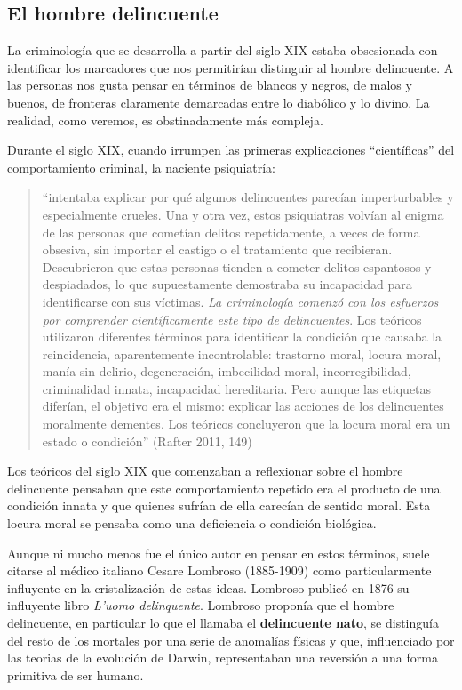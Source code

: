 \documentclass[
  spanish,
  letterpaper,
  DIV=11,
  numbers=noendperiod]{scrreprt}
\begin{document}
\subsection{El hombre delincuente}\label{el-hombre-delincuente}

La criminología que se desarrolla a partir del siglo XIX estaba
obsesionada con identificar los marcadores que nos permitirían
distinguir al hombre delincuente. A las personas nos gusta pensar en
términos de blancos y negros, de malos y buenos, de fronteras claramente
demarcadas entre lo diabólico y lo divino. La realidad, como veremos, es
obstinadamente más compleja.

Durante el siglo XIX, cuando irrumpen las primeras explicaciones
``científicas'' del comportamiento criminal, la naciente psiquiatría:

\begin{quote}
``intentaba explicar por qué algunos delincuentes parecían
imperturbables y especialmente crueles. Una y otra vez, estos
psiquiatras volvían al enigma de las personas que cometían delitos
repetidamente, a veces de forma obsesiva, sin importar el castigo o el
tratamiento que recibieran. Descubrieron que estas personas tienden a
cometer delitos espantosos y despiadados, lo que supuestamente
demostraba su incapacidad para identificarse con sus víctimas. \emph{La
criminología comenzó con los esfuerzos por comprender científicamente
este tipo de delincuentes}. Los teóricos utilizaron diferentes términos
para identificar la condición que causaba la reincidencia, aparentemente
incontrolable: trastorno moral, locura moral, manía sin delirio,
degeneración, imbecilidad moral, incorregibilidad, criminalidad innata,
incapacidad hereditaria. Pero aunque las etiquetas diferían, el objetivo
era el mismo: explicar las acciones de los delincuentes moralmente
dementes. Los teóricos concluyeron que la locura moral era un estado o
condición'' (Rafter 2011, 149)
\end{quote}

Los teóricos del siglo XIX que comenzaban a reflexionar sobre el hombre
delincuente pensaban que este comportamiento repetido era el producto de
una condición innata y que quienes sufrían de ella carecían de sentido
moral. Esta locura moral se pensaba como una deficiencia o condición
biológica.

Aunque ni mucho menos fue el único autor en pensar en estos términos,
suele citarse al médico italiano Cesare Lombroso (1885-1909) como
particularmente influyente en la cristalización de estas ideas. Lombroso
publicó en 1876 su influyente libro \emph{L'uomo delinquente}. Lombroso
proponía que el hombre delincuente, en particular lo que el llamaba el
\textbf{delincuente nato}, se distinguía del resto de los mortales por
una serie de anomalías físicas y que, influenciado por las teorias de la
evolución de Darwin, representaban una reversión a una forma primitiva
de ser humano.
\end{document}
